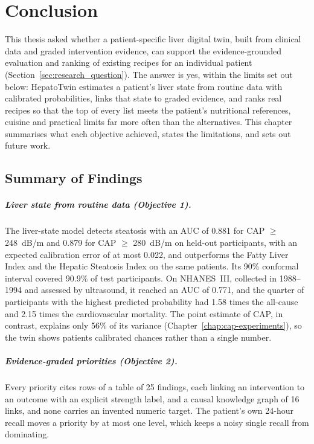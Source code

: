 \chapter{Conclusion}
\label{chap:conclusion}

This thesis asked whether a patient-specific liver digital twin, built from
clinical data and graded intervention evidence, can support the
evidence-grounded evaluation and ranking of existing recipes for an individual
patient (Section~\ref{sec:research_question}). The answer is yes, within the
limits set out below: HepatoTwin estimates a patient's liver state from
routine data with calibrated probabilities, links that state to graded
evidence, and ranks real recipes so that the top of every list meets the
patient's nutritional references, cuisine and practical limits far more often
than the alternatives. This chapter summarises what each objective achieved,
states the limitations, and sets out future work.

\section{Summary of Findings}
\label{sec:c_findings}

\paragraph{Liver state from routine data (Objective 1).} The liver-state model
detects steatosis with an AUC of 0.881 for CAP $\geq$ 248~dB/m and 0.879 for
CAP $\geq$ 280~dB/m on held-out participants, with an expected calibration
error of at most 0.022, and outperforms the Fatty Liver Index and the Hepatic
Steatosis Index on the same patients. Its 90\% conformal interval covered
90.9\% of test participants. On NHANES~III, collected in 1988--1994 and
assessed by ultrasound, it reached an AUC of 0.771, and the quarter of
participants with the highest predicted probability had 1.58 times the
all-cause and 2.15 times the cardiovascular mortality. The point estimate of
CAP, in contrast, explains only 56\% of its variance (Chapter~\ref{chap:cap-experiments}),
so the twin shows patients calibrated chances rather than a single number.

\paragraph{Evidence-graded priorities (Objective 2).} Every priority cites
rows of a table of 25 findings, each linking an intervention to an outcome
with an explicit strength label, and a causal knowledge graph of 16 links, and none carries an invented
numeric target. The patient's own 24-hour recall moves a priority by at most
one level, which keeps a noisy single recall from dominating.

